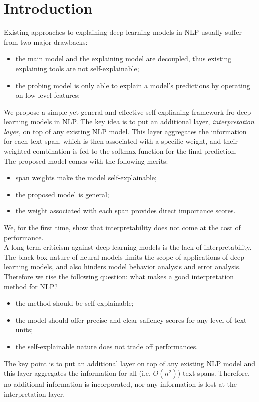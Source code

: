\section{Introduction}

Existing approaches to explaining deep learning models in NLP usually suffer
from two major drawbacks:
\begin{itemize}
    \item the main model and the explaining model are decoupled, thus existing
        explaining tools are not self-explainable;

    \item the probing model is only able to explain a model's predictions by
        operating on low-level features;
\end{itemize}

We propose a simple yet general and effective self-explianing framework fro deep
learning models in NLP. The key idea is to put an additional layer,
\textit{interpretation layer}, on top of any existing NLP model.
This layer aggregates the information for each text span, which is then
associated with a specific weight, and their weighted combination is fed to the
softmax function for the final prediction.\\
The proposed model comes with the following merits:
\begin{itemize}
    \item span weights make the model self-explainable;
    \item the proposed model is general;
    \item the weight associated with each span provides direct importance
        scores.
\end{itemize}

We, for the first time, show that interpretability does not come at the cost of
performance.\\

A long term criticism against deep learning models is the lack of
interpretability. The black-box nature of neural models limits the scope of
applications of deep learning models, and also hinders model behavior analysis
and error analysis.\\
Therefore we rise the following question: what makes a good interpretation
method for NLP?
\begin{itemize}
    \item the method should be self-explainable;
    \item the model should offer precise and clear saliency scores for any level
        of text units;
    \item the self-explainable nature does not trade off performances.
\end{itemize}

The key point is to put an additional layer on top of any existing NLP model and
this layer aggregates the information for all (i.e. $O(n^2)$) text spans.
Therefore, no additional information is incorporated, nor any information is
lost at the interpretation layer.
